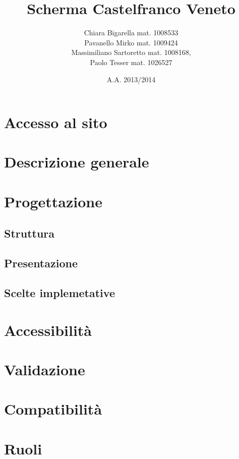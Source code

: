 
	
\title{\bfseries Scherma Castelfranco Veneto}
\author{Chiara Bigarella mat. 1008533\\Pavanello Mirko mat. 1009424 \\Massimiliano Sartoretto mat. 1008168,\\ Paolo Tesser mat. 1026527}
\date{A.A. 2013/2014}



\pagestyle{romano}
\newpage
	\tableofcontents
	\listoffigures
\newpage
{}
\pagestyle{std}


\newpage
\section{Accesso al sito}
	

\section{Descrizione generale}
	
	
\newpage
\section{Progettazione}
	\subsection{Struttura}
		
	\subsection{Presentazione}
		
	\subsection{Scelte implemetative}
		
\newpage
\section{Accessibilit\`a}
		

\newpage
\section{Validazione}
		

\newpage
\section{Compatibilit\`a}
	
\newpage
\section{Ruoli}
	
